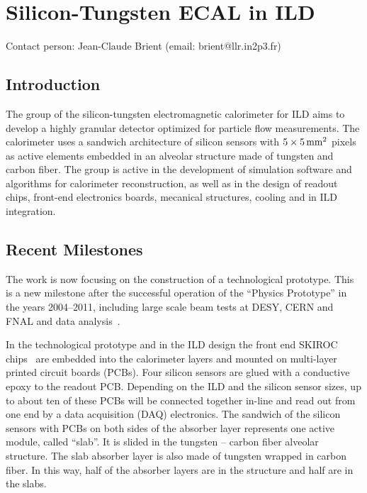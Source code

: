 \section{Silicon-Tungsten ECAL in ILD}
Contact person: Jean-Claude Brient (email: brient@llr.in2p3.fr)
\subsection{Introduction}
The group of the silicon-tungsten electromagnetic calorimeter for ILD aims to develop a highly
granular detector optimized for particle flow measurements. The calorimeter uses a
sandwich architecture of silicon sensors with $\unit[5\times5]{mm^2}$ pixels as active elements embedded in an
alveolar structure made of tungsten and carbon fiber. The group is active in the development of
simulation software and algorithms for calorimeter reconstruction, as well as in the design of readout
chips, front-end electronics boards, mecanical structures, cooling and in ILD
integration.

\subsection{Recent Milestones}
The work is now focusing on the construction of a technological prototype. This
is a new milestone after the successful operation of the ``Physics Prototype'' in the
years 2004--2011, including large scale beam tests at DESY, CERN and FNAL and data
analysis~\cite{1748-0221-3-08-P08001,2009JPhCS.160a2065B,2010JInst...5T5007A,Adloff201197,1748-0221-6-07-P07005}.

In the technological prototype and in the ILD design the front end SKIROC
chips~\cite{1748-0221-6-12-C12040,Amjad201578} are embedded into the calorimeter layers and mounted on
multi-layer printed circuit boards (PCBs). Four silicon sensors are glued with
a conductive epoxy to the readout PCB. Depending on the ILD and the silicon
sensor sizes, up to about ten of these PCBs will be connected together in-line
and read out from one end by a data acquisition (DAQ) electronics. The sandwich
of the silicon sensors with PCBs on both sides of the absorber layer
represents one active module, called ``slab''. It is slided in the tungsten --
carbon fiber alveolar structure. The slab absorber layer is also made of
tungsten wrapped in carbon fiber. In this way, half of the absorber layers are
in the structure and half are in the slabs.

